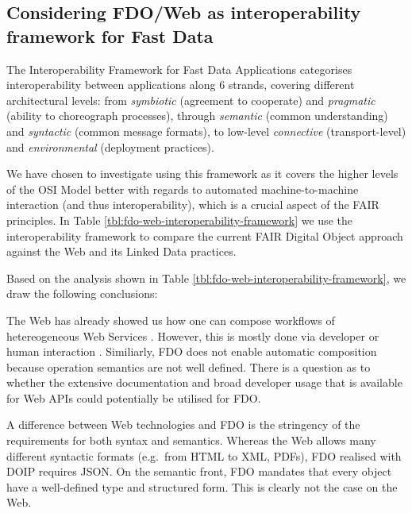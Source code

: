 \documentclass[fleqn,10pt,lineno]{wlpeerjlua}
\begin{document}
\subsection*{Considering FDO/Web as interoperability framework for Fast Data}\label{sec:interoperability-compare}

The Interoperability Framework for Fast Data Applications \autocite{delgadoInteroperabilityFrameworkDistributed2016a} categorises interoperability between applications along 6 strands, covering different architectural levels: from \emph{symbiotic} (agreement to cooperate) and \emph{pragmatic} (ability to choreograph processes), through \emph{semantic} (common understanding) and \emph{syntactic} (common message formats), to low-level \emph{connective} (transport-level) and \emph{environmental} (deployment practices).

We have chosen to investigate using this framework as it covers the higher levels of the OSI Model \autocite{stallingsHandbookComputercommunicationsStandards1990} better with regards to automated machine-to-machine interaction (and thus interoperability), which is a crucial aspect of the FAIR principles. In Table \vref{tbl:fdo-web-interoperability-framework} we use the interoperability framework to compare the current FAIR Digital Object approach against the Web and its Linked Data practices.

Based on the analysis shown in Table \ref{tbl:fdo-web-interoperability-framework}, we draw the following conclusions:

The Web has already showed us how one can compose workflows of hetereogeneous Web Services \autocite{wolstencroftTavernaWorkflowSuite2013d}. However, this is mostly done via developer or human interaction \autocite{lamprechtPerspectivesAutomatedComposition2021b}. Similiarly, FDO does not enable automatic composition because operation semantics are not well defined. There is a question as to whether the extensive documentation and broad developer usage that is available for Web APIs could potentially be utilised for FDO.

A difference between Web technologies and FDO is the stringency of the requirements for both syntax and semantics. Whereas the Web allows many different syntactic formats (e.g.~from HTML to XML, PDFs), FDO realised with DOIP requires JSON. On the semantic front, FDO mandates that every object have a well-defined type and structured form. This is clearly not the case on the Web.
\end{document}
